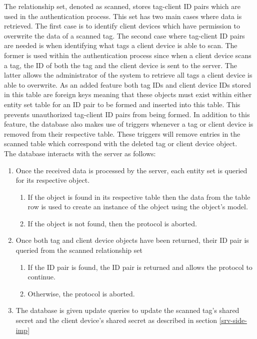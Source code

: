 The relationship set, denoted as scanned, stores tag-client ID pairs which are used in the authentication process. This set has two main cases where data is retrieved. The first case is to identify client devices which have permission to overwrite the data of a scanned tag. The second case where tag-client ID pairs are needed is when identifying what tags a client device is able to scan. The former is used within the authentication process since when a client device scans a tag, the ID of both the tag and the client device is sent to the server. The latter allows the administrator of the system to retrieve all tags a client device is able to overwrite. As an added feature both tag IDs and client device IDs stored in this table are foreign keys meaning that these objects must exist within either entity set table for an ID pair to be formed and inserted into this table. This prevents unauthorized tag-client ID pairs from being formed. In addition to this feature, the database also makes use of triggers whenever a tag or client device is removed from their respective table. These triggers will remove entries in the scanned table which correspond with the deleted tag or client device object.\\

\noindent The database interacts with the server as follows:
\begin{enumerate}
    \item Once the received data is processed by the server, each entity set is queried for its respective object.
    \begin{enumerate}
        \item If the object is found in its respective table then the data from the table row is used to create an instance of the object using the object’s model.
        \item If the object is not found, then the protocol is aborted.
    \end{enumerate}
    \item Once both tag and client device objects have been returned, their ID pair is queried from the scanned relationship set
    \begin{enumerate}
        \item If the ID pair is found, the ID pair is returned and allows the protocol to continue.
        \item Otherwise, the protocol is aborted.
    \end{enumerate}
    \item The database is given update queries to update the scanned tag’s shared secret and the client device’s shared secret as described in section \ref{srv-side-imp}
\end{enumerate}